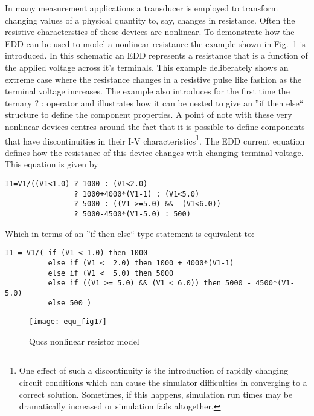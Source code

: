 In many measurement applications a transducer is employed to transform
changing values of a physical quantity to, say, changes in resistance.
Often the resistive characterstics of these devices are nonlinear. To
demonstrate how the EDD can be used to model a nonlinear resistance
the example shown in Fig.~\ref{fig:equ_17} is introduced. In this
schematic an EDD represents a resistance that is a function of the
applied voltage across it's terminals.  This example deliberately
shows an extreme case where the resistance changes in a resistive
pulse like fashion as the terminal voltage increases. The example also
introduces for the first time the ternary ? : operator and illustrates
how it can be nested to give an ''if then else`` structure to define
the component properties. A point of note with these very nonlinear
devices centres around the fact that it is possible to define
components that have discontinuities in their I-V
characteristics\footnote{One effect of such a discontinuity is the
introduction of rapidly changing circuit conditions which can cause
the simulator difficulties in converging to a correct
solution. Sometimes, if this happens, simulation run times may be
dramatically increased or simulation fails altogether.}. The EDD
current equation defines how the resistance of this device changes
with changing terminal voltage.  This equation is given by

\begin{verbatim}
I1=V1/((V1<1.0) ? 1000 : (V1<2.0) 
                ? 1000+4000*(V1-1) : (V1<5.0) 
                ? 5000 : ((V1 >=5.0) &&  (V1<6.0)) 
                ? 5000-4500*(V1-5.0) : 500)
\end{verbatim}  

Which in terms of an ''if then else`` type statement is equivalent to:

\begin{verbatim}
I1 = V1/( if (V1 < 1.0) then 1000
          else if (V1 <  2.0) then 1000 + 4000*(V1-1)
          else if (V1 <  5.0) then 5000
          else if ((V1 >= 5.0) && (V1 < 6.0)) then 5000 - 4500*(V1-5.0)
          else 500 )
\end{verbatim} 


\begin{figure}[h]
  \centering
  \texttt{[image: equ\_fig17]}
  \caption{Qucs nonlinear resistor model}
  \label{fig:equ_17} 
\end{figure} 





